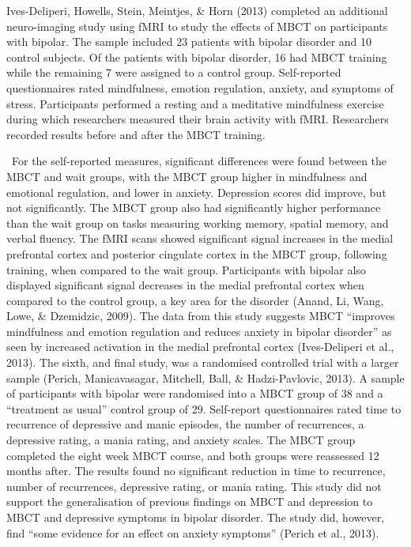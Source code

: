 {Ives-Deliperi, Howells, Stein, Meintjes, & Horn (2013) completed an additional neuro-imaging study using fMRI to study the effects of MBCT on participants with bipolar. The sample included 23 patients with bipolar disorder and 10 control subjects. Of the patients with bipolar disorder, 16 had MBCT training while the remaining 7 were assigned to a control group. Self-reported questionnaires rated mindfulness, emotion regulation, anxiety, and symptoms of stress. Participants performed a resting and a meditative mindfulness exercise during which researchers measured their brain activity with fMRI. Researchers recorded results before and after the MBCT training.

 For the self-reported measures, significant differences were found between the MBCT and wait groups, with the MBCT group higher in mindfulness and emotional regulation, and lower in anxiety. Depression scores did improve, but not significantly. The MBCT group also had significantly higher performance than the wait group on tasks measuring working memory, spatial memory, and verbal fluency. The fMRI scans showed significant signal increases in the medial prefrontal cortex and posterior cingulate cortex in the MBCT group, following training, when compared to the wait group. Participants with bipolar also displayed significant signal decreases in the medial prefrontal cortex when compared to the control group, a key area for the disorder (Anand, Li, Wang, Lowe, & Dzemidzic, 2009). The data from this study suggests MBCT “improves mindfulness and emotion regulation and reduces anxiety in bipolar disorder” as seen by increased activation in the medial prefrontal cortex (Ives-Deliperi et al., 2013).
The sixth, and final study, was a randomised controlled trial with a larger sample (Perich, Manicavasagar, Mitchell, Ball, & Hadzi-Pavlovic, 2013). A sample of participants with bipolar were randomised into a MBCT group of 38 and a “treatment as usual” control group of 29. Self-report questionnaires rated time to recurrence of depressive and manic episodes, the number of recurrences, a depressive rating, a mania rating, and anxiety scales. The MBCT group completed the eight week MBCT course, and both groups were reassessed 12 months after. The results found no significant reduction in time to recurrence, number of recurrences, depressive rating, or mania rating. This study did not support the generalisation of previous findings on MBCT and depression to MBCT and depressive symptoms in bipolar disorder. The study did, however, find “some evidence for an effect on anxiety symptoms” (Perich et al., 2013). 

}
